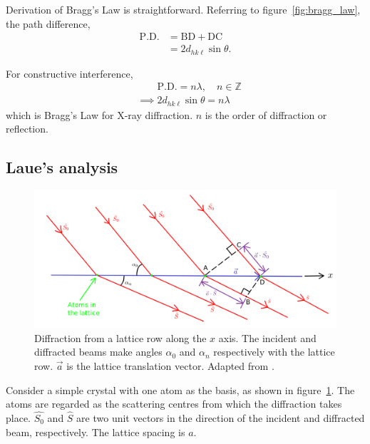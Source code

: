 	Derivation of Bragg's Law is straightforward. Referring to figure~\ref{fig:bragg_law}, the path difference,%
%	
	\begin{align}
	\mathrm{P.D.} &= \mathrm{BD} + \mathrm{DC} \nonumber\\
				&= 2 d_{hk\ell} \sin \theta.
	\end{align}
	
	For constructive interference,%
%	
	\begin{align}
	&\phantom{\implies} \mathrm{P.D.} = n \lambda,\quad n \in \mathbb{Z} \nonumber\\
	&\implies \boxed{2 d_{hk\ell} \sin \theta = n \lambda} \label{eq:bragg_law}
	\end{align}
%	
	which is Bragg's Law for X-ray diffraction. $n$ is the order of diffraction or reflection.
	
	
\subsection{Laue's analysis}

	\begin{figure}
	\centering
	\includegraphics[scale=0.17]{laue_analysis.png}
	\caption{\label{fig:laue_analysis}Diffraction from a lattice row along the $x$ axis. The incident and diffracted beams make angles $\alpha_0$ and $\alpha_n$ respectively with the lattice row. $\vec{a}$ is the lattice translation vector. Adapted from \cite{Hammond2015}.}
	\end{figure}
	
	Consider a simple crystal with one atom as the basis, as shown in figure~\ref{fig:laue_analysis}. The atoms are regarded as the scattering centres from which the diffraction takes place. $\hat{S_0}$ and $\hat{S}$ are two unit vectors in the direction of the incident and diffracted beam, respectively. The lattice spacing is $a$.
	

